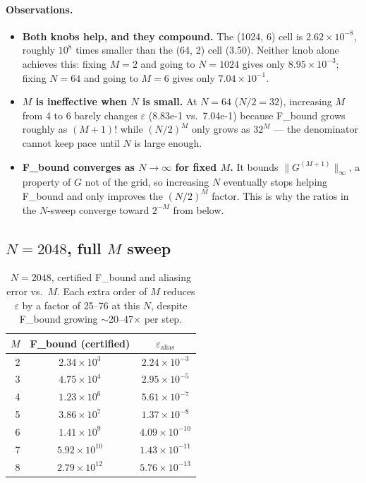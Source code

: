 \documentclass[11pt]{article}
\theoremstyle{definition}
\begin{document}
\paragraph{Observations.}
\begin{itemize}
  \item \textbf{Both knobs help, and they compound.}
        The (1024, 6) cell is $2.62\times10^{-8}$, roughly $10^8$ times smaller
        than the (64, 2) cell ($3.50$).  Neither knob alone achieves this:
        fixing $M=2$ and going to $N=1024$ gives only $8.95\times10^{-3}$;
        fixing $N=64$ and going to $M=6$ gives only $7.04\times10^{-1}$.

  \item \textbf{$M$ is ineffective when $N$ is small.}
        At $N=64$ ($N/2 = 32$), increasing $M$ from 4 to 6 barely changes
        $\varepsilon$ (8.83e-1 vs.\ 7.04e-1) because F\_bound grows roughly
        as $(M+1)!$ while $(N/2)^M$ only grows as $32^M$ --- the denominator
        cannot keep pace until $N$ is large enough.

  \item \textbf{F\_bound converges as $N\to\infty$ for fixed $M$.}
        It bounds $\|G^{(M+1)}\|_\infty$, a property of $G$ not of the grid,
        so increasing $N$ eventually stops helping F\_bound and only improves
        the $(N/2)^M$ factor.  This is why the ratios in the $N$-sweep
        converge toward $2^{-M}$ from below.
\end{itemize}

\subsection{$N=2048$, full $M$ sweep}

\begin{table}[H]
\centering
\begin{tabular}{r|cc}
\toprule
$M$ & F\_bound (certified) & $\varepsilon_{\mathrm{alias}}$ \\
\midrule
2 & $2.34\times10^{3}$ & $2.24\times10^{-3}$ \\
3 & $4.75\times10^{4}$ & $2.95\times10^{-5}$ \\
4 & $1.23\times10^{6}$ & $5.61\times10^{-7}$ \\
5 & $3.86\times10^{7}$ & $1.37\times10^{-8}$ \\
6 & $1.41\times10^{9}$ & $4.09\times10^{-10}$ \\
7 & $5.92\times10^{10}$ & $1.43\times10^{-11}$ \\
8 & $2.79\times10^{12}$ & $5.76\times10^{-13}$ \\
\bottomrule
\end{tabular}
\caption{$N=2048$, certified F\_bound and aliasing error vs.\ $M$.
         Each extra order of $M$ reduces $\varepsilon$ by a factor of 25--76
         at this $N$, despite F\_bound growing $\sim$20--47$\times$ per step.}
\label{tab:n2048}
\end{table}
\end{document}
